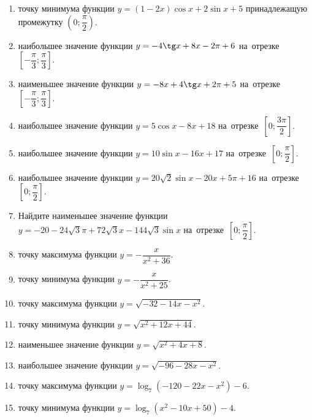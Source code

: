 \documentclass[a4paper,10pt]{article}
\begin{document}
\begin{enumerate}
\item {} точку минимума функции $y=\left(1-2x\right)\cos x +2\sin x+5$
принадлежащую промежутку $\left(0;\dfrac{\pi}{2}\right)$.

\item {} наибольшее значение функции $y=-4\tg x +8x-2\pi +6$ на~отрезке~$\left[-\dfrac{\pi}{3};\dfrac{\pi}{3}\right]$.

\item {} наименьшее значение функции $y=-8x +4\tg x+2\pi+5$ на~отрезке~$\left[-\dfrac{\pi}{3};\dfrac{\pi}{3}\right]$.

\item {} наибольшее значение функции $y=5\cos x-8x+18$ на~отрезке~$\left[0;\dfrac{3\pi}{2}\right]$.

\item {} наибольшее значение функции $y=10\sin x-16x+17$ на~отрезке~$\left[0;\dfrac{\pi}{2}\right]$.

\item {} наибольшее значение функции $y=20\sqrt{2}\sin x-20x+5\pi +16$ на~отрезке~$\left[0;\dfrac{\pi}{2}\right]$.

\item Найдите наименьшее значение функции $y=-20-24\sqrt{3}\pi+72\sqrt{3}x-144\sqrt{3}\sin x$ на~отрезке~$\left[0;\dfrac{\pi}{2}\right]$.

\item {} точку максимума функции $y=-\dfrac{x}{ x^2 +36}$.

\item {} точку минимума функции $y=-\dfrac{x}{ x^2 +25}$.

\item {} точку максимума функции $y=\sqrt{-32-14x-x^2}$.

\item {} точку минимума функции $y=\sqrt{x^2+12x+44}$.

\item {} наименьшее значение функции $y=\sqrt{x^2+4x+8}$.

\item {} наибольшее значение функции $y=\sqrt{-96-28x-x^2}$.

\item {} точку максимума функции $y=\log_7\left(-120-22x-x^2\right)-6$.

\item {} точку минимума функции $y=\log_7\left(x^2-10x+50\right)-4$.


\end{enumerate}
\end{document}
